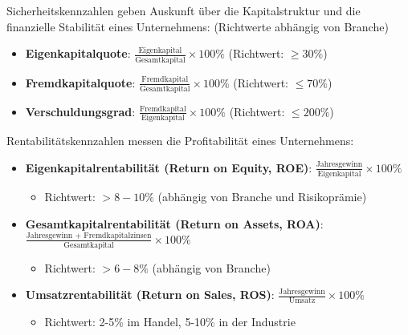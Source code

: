 \begin{definition}{Sicherheitskennzahlen}
     geben Auskunft über die Kapitalstruktur und die finanzielle Stabilität eines Unternehmens: (Richtwerte abhängig von Branche)
\begin{itemize}
    \item \textbf{Eigenkapitalquote}: $\frac{\text{Eigenkapital}}{\text{Gesamtkapital}} \times 100\%$ (Richtwert: $\geq 30\%$)
    \item \textbf{Fremdkapitalquote}: $\frac{\text{Fremdkapital}}{\text{Gesamtkapital}} \times 100\%$ (Richtwert: $\leq 70\%$)
    \item \textbf{Verschuldungsgrad}: $\frac{\text{Fremdkapital}}{\text{Eigenkapital}} \times 100\%$ (Richtwert: $\leq 200\%$)
\end{itemize}
\end{definition}

\begin{definition}{Rentabilitätskennzahlen} messen die Profitabilität eines Unternehmens:
\begin{itemize}
    \item \textbf{Eigenkapitalrentabilität (Return on Equity, ROE)}: $\frac{\text{Jahresgewinn}}{\text{Eigenkapital}} \times 100\%$
    \begin{itemize}
        \item Richtwert: $> 8-10\%$ (abhängig von Branche und Risikoprämie)
    \end{itemize}
    \item \textbf{Gesamtkapitalrentabilität (Return on Assets, ROA)}: \\ $\frac{\text{Jahresgewinn + Fremdkapitalzinsen}}{\text{Gesamtkapital}} \times 100\%$
    \begin{itemize}
        \item Richtwert: $> 6-8\%$ (abhängig von Branche)
    \end{itemize}
    \item \textbf{Umsatzrentabilität (Return on Sales, ROS)}: $\frac{\text{Jahresgewinn}}{\text{Umsatz}} \times 100\%$
    \begin{itemize}
        \item Richtwert: 2-5\% im Handel, 5-10\% in der Industrie
    \end{itemize}
\end{itemize}
\end{definition}

